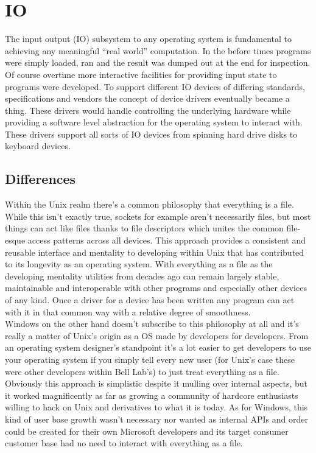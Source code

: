 \documentclass[letterpaper,10pt,draftclsnofoot,onecolumn]{IEEEtran}
\begin{document}
\section{IO}
The input output (IO) subsystem to any operating system is fundamental to achieving any meaningful “real world” computation. In the before times programs were simply loaded, ran and the result was dumped out at the end for inspection. Of course overtime more interactive facilities for providing input state to programs were developed. To support different IO devices of differing standards, specifications and vendors the concept of device drivers eventually became a thing. These drivers would handle controlling the underlying hardware while providing a software level abstraction for the operating system to interact with. These drivers support all sorts of IO devices from spinning hard drive disks to keyboard devices.\\
\subsection{Differences}
Within the Unix realm there’s a common philosophy \cite{love} that everything is a file. While this isn’t exactly true, sockets for example aren’t necessarily files, but most things can act like files thanks to file descriptors which unites the common file-esque access patterns across all devices. This approach provides a consistent and reusable interface and mentality to developing within Unix that has contributed to its longevity as an operating system. With everything as a file as the developing mentality utilities from decades ago can remain largely stable, maintainable and interoperable with other programs and especially other devices of any kind. Once a driver for a device has been written any program can act with it in that common way with a relative degree of smoothness.\\

Windows on the other hand doesn’t subscribe to this philosophy at all and it’s really a matter of Unix’s origin as a OS made by developers for developers. From an operating system designer’s standpoint it’s a lot easier to get developers to use your operating system if you simply tell every new user (for Unix’s case these were other developers within Bell Lab’s) to just treat everything as a file. Obviously this approach is simplistic despite it mulling over internal aspects, but it worked magnificently as far as growing a community of hardcore enthusiasts willing to hack on Unix and derivatives to what it is today. As for Windows, this kind of user base growth wasn’t necessary nor wanted as internal APIs and order could be created for their own Microsoft developers and its target consumer customer base had no need to interact with everything as a file.\\
\end{document}
